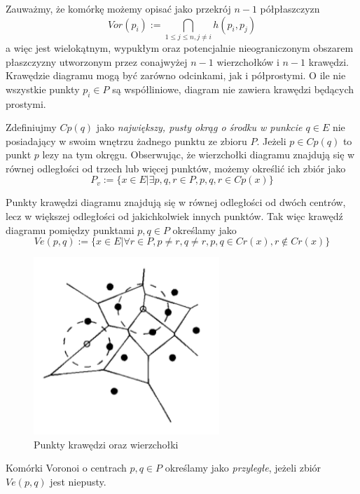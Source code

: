 \documentclass[skorowidz,autorrok,backref,xodstep,oswiadczenie]{wmimgr}
\begin{document}
Zauważmy, że komórkę możemy opisać jako przekrój $n-1$ półpłaszczyzn
\begin{equation}
Vor(p_{i}) := \bigcap_{1 \leq j \leq n, j \neq i} h(p_{i},p_{j})
\end{equation}
a więc jest wielokątnym, wypukłym oraz potencjalnie nieograniczonym obszarem płaszczyzny utworzonym przez conajwyżej $n-1$ wierzchołków i $n-1$ krawędzi. Krawędzie diagramu mogą być zarówno odcinkami, jak i półprostymi. O ile nie wszystkie punkty $p_{i} \in P$ są współliniowe, diagram nie zawiera krawędzi będących prostymi.

Zdefiniujmy $Cp(q)$ jako \emph{największy, pusty okrąg o środku w punkcie $q \in E$} nie posiadający w swoim wnętrzu żadnego punktu ze zbioru $P$. Jeżeli $p \in Cp(q)$ to punkt $p$ lezy na tym okręgu.
Obserwując, że wierzchołki diagramu znajdują się w równej odległości od trzech lub więcej punktów, możemy określić ich zbiór jako
\begin{equation}
P_{v} := \{ x \in E | \exists p,q,r \in P, p,q,r \in Cp(x) \}
\end{equation}

Punkty krawędzi diagramu znajdują się w równej odległości od dwóch centrów, lecz w większej odległości od jakichkolwiek innych punktów. Tak więc krawędź diagramu pomiędzy punktami $p,q \in P$ określamy jako
\begin{equation}
Ve(p,q) := \{ x \in E | \forall r \in P, p \neq r, q \neq r, p,q \in Cr(x), r \notin Cr(x) \}
\end{equation}

\begin{figure}[ht!]
\centering
\includegraphics[width=70mm]{images/voronoi2.png}
\caption{Punkty krawędzi oraz wierzchołki}
\label{voronoicircles}
\end{figure}

Komórki Voronoi o centrach $p,q \in P$ określamy jako \emph{przyległe}, jeżeli zbiór $Ve(p,q)$ jest niepusty.
\end{document}
